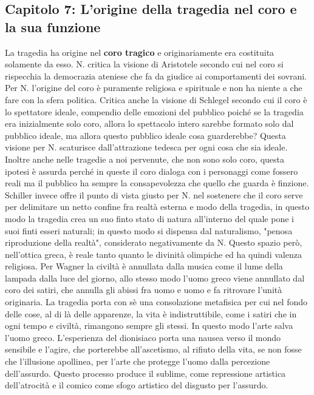 \documentclass[10pt,a4paper]{article}
\begin{document}
\subsection{Capitolo 7: L'origine della tragedia nel coro e la sua funzione}
La tragedia ha origine nel \textbf{coro tragico} e originariamente era costituita solamente da esso. N. critica la visione di Aristotele secondo cui nel coro si rispecchia la democrazia ateniese che fa da giudice ai comportamenti dei sovrani. Per N. l'origine del coro è puramente religiosa e spirituale e non ha niente a che fare con la sfera politica. Critica anche la visione di Schlegel secondo cui il coro è lo spettatore ideale, compendio delle emozioni del pubblico poiché se la tragedia era inizialmente solo coro, allora lo spettacolo intero sarebbe formato solo dal pubblico ideale, ma allora questo pubblico ideale cosa guarderebbe? Questa visione per N. scaturisce dall'attrazione tedesca per ogni cosa che sia ideale. Inoltre anche nelle tragedie a noi pervenute, che non sono solo coro, questa ipotesi è assurda perché in queste il coro dialoga con i personaggi come fossero reali ma il pubblico ha sempre la consapevolezza che quello che guarda è finzione. Schiller invece offre il punto di vista giusto per N. nel sostenere che il coro serve per delimitare un netto confine fra realtà esterna e modo della tragedia, in questo modo la tragedia crea un suo finto stato di natura all'interno del quale pone i suoi finti esseri naturali; in questo modo si dispensa dal naturalismo, "penosa riproduzione della realtà", considerato negativamente da N. Questo spazio però, nell'ottica greca, è reale tanto quanto le divinità olimpiche ed ha quindi valenza religiosa. Per Wagner la civiltà è annullata dalla musica come il lume della lampada dalla luce del giorno, allo stesso modo l'uomo greco viene annullato dal coro dei satiri, che annulla gli abissi fra uomo e uomo e fa ritrovare l'unità originaria. La tragedia porta con sè una consolazione metafisica per cui nel fondo delle cose, al di là delle apparenze, la vita è indistruttibile, come i satiri che in ogni tempo e civiltà, rimangono sempre gli stessi. In questo modo l'arte salva l'uomo greco. L'esperienza del dionisiaco porta una nausea verso il mondo sensibile e l'agire, che porterebbe all'ascetismo, al rifiuto della vita, se non fosse che l'illusione apollinea, per l'arte che protegge l'uomo dalla percezione dell'assurdo. Questo processo produce il sublime, come repressione artistica dell'atrocità e il comico come sfogo artistico del disgusto per l'assurdo.
\end{document}
